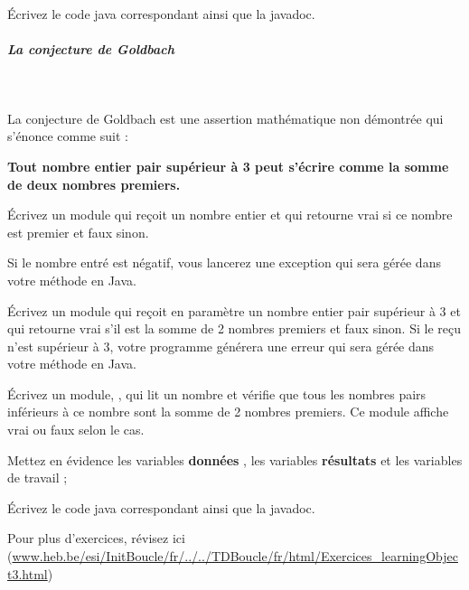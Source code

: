 \documentclass[11pt,a4paper]{article}
\begin{document}
            \par
        \'Ecrivez le code java correspondant ainsi que la javadoc.
            \par
        
			
		\subparagraph{La conjecture de Goldbach} 
		
					\textcolor{white}{.} \par
				
          La conjecture de Goldbach est une assertion math\'ematique non d\'emontr\'ee qui s'\'enonce comme suit :
        
            \par
        \textbf{Tout nombre entier pair sup\'erieur \`a 3 peut s'\'ecrire comme la somme de deux nombres premiers.}
            \par
        
          \'Ecrivez un module \verb@isPremier@ qui re\c coit un nombre entier \verb@n@ 
          et qui retourne vrai si ce nombre est premier et faux sinon.
        
            \par
        Si le nombre entr\'e est n\'egatif, vous lancerez une exception qui sera g\'er\'ee dans votre m\'ethode 
        \verb@main@ en Java.
            \par
        
          \'Ecrivez un module \verb@goldbach@ qui re\c coit en param\`etre 
          un nombre entier pair \verb@p@ sup\'erieur \`a 3 
          et qui retourne vrai s'il est la somme de 2 nombres premiers et faux sinon.
          Si le \verb@p@ re\c cu n'est sup\'erieur \`a 3, votre programme g\'en\'erera une erreur qui sera g\'er\'ee dans votre m\'ethode 
        \verb@main@ en Java.
            \par
        
          \'Ecrivez un module, \verb@principal@, qui lit un nombre et v\'erifie que tous les
          nombres pairs inf\'erieurs \`a ce nombre sont la somme de 2 nombres premiers. Ce module affiche vrai ou faux selon le cas.
        
            \par
        
          Mettez en \'evidence les variables \textbf{\guillemotleft  donn\'ees \guillemotright }, 
          les variables \textbf{\guillemotleft  r\'esultats \guillemotright } et les variables de travail ;
        
            \par
        \'Ecrivez le code java correspondant ainsi que la javadoc.
            \par
        Pour plus d'exercices, 
        r\'evisez ici (\url{www.heb.be/esi/InitBoucle/fr/../../TDBoucle/fr/html/Exercices\_learningObject3.html})
            \par
        
				
\end{document}
